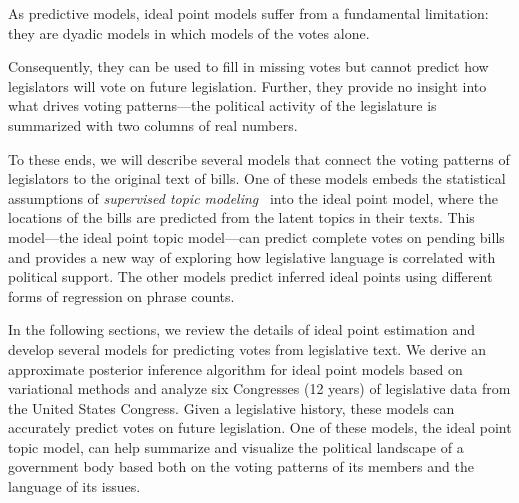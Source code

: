 
As predictive models, ideal point models suffer from a fundamental
limitation: they are dyadic models in which models of the votes alone.

Consequently, they can be used to fill in missing votes but cannot
predict how legislators will vote on future legislation.  Further,
they provide no insight into what drives voting patterns---the
political activity of the legislature is summarized with two columns
of real numbers.

To these ends, we will describe several models that connect the voting
patterns of legislators to the original text of bills.  One of these
models embeds the statistical assumptions of \textit{supervised topic
  modeling}~\citep{blei:2008} into the ideal point model, where the
locations of the bills are predicted from the latent topics in their
texts. This model---the ideal point topic model---can predict complete
votes on pending bills and provides a new way of exploring how
legislative language is correlated with political support.  The other
models predict inferred ideal points using different forms of
regression on phrase counts.

In the following sections, we review the details of ideal point
estimation and develop several models for predicting votes from
legislative text.  We derive an approximate posterior inference
algorithm for ideal point models based on variational methods and
analyze six Congresses (12 years) of legislative data from the United
States Congress.  Given a legislative history, these models can
accurately predict votes on future legislation.  One of these models,
the ideal point topic model, can help summarize and visualize the
political landscape of a government body based both on the voting
patterns of its members and the language of its issues.

